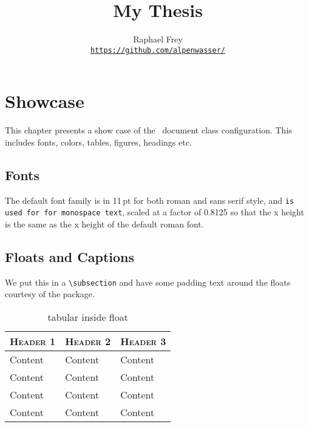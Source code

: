\documentclass[a4paper,11pt,oneside,showtrims]{alpenthesis}
\title{My Thesis}
\author{Raphael Frey \\[1ex]\href{https://github.com/alpenwasser/}
                                 {\nolinkurl{https://github.com/alpenwasser/}}}
\begin{document}
\begin{titlingpage}
    \maketitle
\end{titlingpage}
\frontmatter
\tableofcontents*

\mainmatter
\chapter{Showcase}

\lipsum[1-2]
This chapter presents a show case of the \athes\ document class configuration.
This includes fonts, colors, tables, figures, headings etc.

\section{Fonts}

The default  font family  is   in 11\,pt  for both  roman and
\textsf{sans serif  style}, and   \texttt{is  used for
for monospace text}, scaled at a factor of  0.8125 so that the x height is the
same as the x height of the default roman font.

\section{Floats and Captions}

We put  this in  a \verb|\subsection|  and have some  padding text  around the
floats courtesy of the  package.

\begin{table}
    \centering
    \caption{tabular inside float}
    \label{tab:float}
    \begin{tabular}{lll}
        \toprule
        \scshape Header 1 & \scshape Header 2 & \scshape Header 3 \\
        \midrule
        Content           & Content           & Content           \\
        Content           & Content           & Content           \\
        Content           & Content           & Content           \\
        Content           & Content           & Content           \\
        \bottomrule
    \end{tabular}
\end{table}
\end{document}
